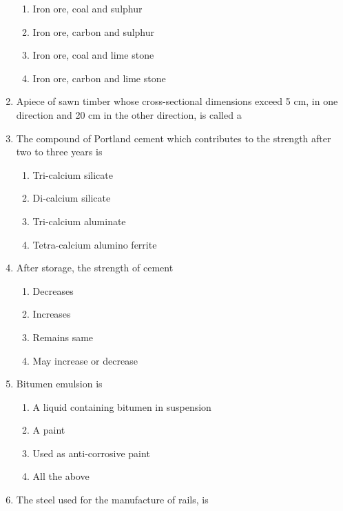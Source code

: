 \documentclass[11pt,a4paper]{article}
\begin{document}
\begin{enumerate}
\begin{enumerate}[label=\Alph*.]
\item{Iron ore, coal and sulphur}
\item{Iron ore, carbon and sulphur}
\item{Iron ore, coal and lime stone}
\item{Iron ore, carbon and lime stone}
\end{enumerate}
\item{Apiece of sawn timber whose cross-sectional dimensions exceed 5 cm, in one direction and 20 cm in the other direction, is called a}
\\
\item{The compound of Portland cement which contributes to the strength after two to three years is}
\begin{enumerate}[label=\Alph*.]
\item{Tri-calcium silicate}
\item{Di-calcium silicate}
\item{Tri-calcium aluminate}
\item{Tetra-calcium alumino ferrite}
\end{enumerate}
\item{After storage, the strength of cement}
\begin{enumerate}[label=\Alph*.]
\item{Decreases}
\item{Increases}
\item{Remains same}
\item{May increase or decrease}
\end{enumerate}
\item{Bitumen emulsion is}
\begin{enumerate}[label=\Alph*.]
\item{A liquid containing bitumen in suspension}
\item{A paint}
\item{Used as anti-corrosive paint}
\item{All the above}
\end{enumerate}
\item{The steel used for the manufacture of rails, is}
\begin{enumerate}[label=\Alph*.]

\end{enumerate}
\end{enumerate}
\end{document}
